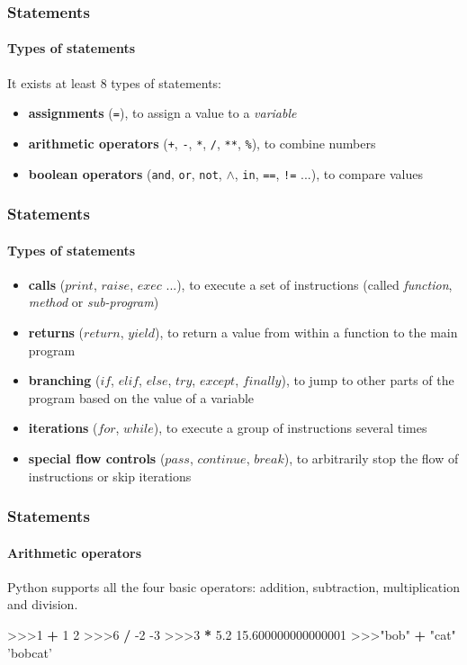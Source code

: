 \documentclass[handout]{beamer}
\def\prompt{>\hspace{-1pt}>\hspace{-1pt}>\/}
\begin{document}
\begin{frame}
	\frametitle{Statements}
	\framesubtitle{Types of statements}

	It exists at least 8 types of statements:

	\begin{itemize}
		\item \textbf{assignments} (\texttt{=}), to assign a value to a \textit{variable}
		\item \textbf{arithmetic operators} (\texttt{+}, \texttt{-}, \texttt{*}, \texttt{/}, \texttt{**}, \texttt{\%}), to combine numbers
		\item \textbf{boolean operators} (\texttt{and}, \texttt{or}, \texttt{not}, $\wedge$, \texttt{in}, \texttt{==}, \texttt{!=} ...), to compare values
	\end{itemize}
\end{frame}

\begin{frame}
	\frametitle{Statements}
	\framesubtitle{Types of statements}

	\begin{itemize}
		\item \textbf{calls} ($print$, $raise$, $exec$ ...), to execute a set of instructions (called \textit{function}, \textit{method} or \textit{sub-program})
		\item \textbf{returns} ($return$, $yield$), to return a value from within a function to the main program
		\item \textbf{branching} ($if$, $elif$, $else$, $try$, $except$, $finally$), to jump to other parts of the program based on the value of a variable
		\item \textbf{iterations} ($for$, $while$), to execute a group of instructions several times
		\item \textbf{special flow controls} ($pass$, $continue$, $break$), to arbitrarily stop the flow of instructions or skip iterations
	\end{itemize}
\end{frame}

\begin{frame}[fragile]
	\frametitle{Statements}
	\framesubtitle{Arithmetic operators}

	Python supports all the four basic operators: addition, subtraction, multiplication and division.

	\begin{semiverbatim}
		\prompt 1 \textbf{+} 1
		2
		\prompt 6 \textbf{/} -2
		-3
		\prompt 3 \textbf{*} 5.2
		15.600000000000001
		\prompt "bob" \textbf{+} "cat"
		'bobcat'
	\end{semiverbatim}
\end{frame}
\end{document}
